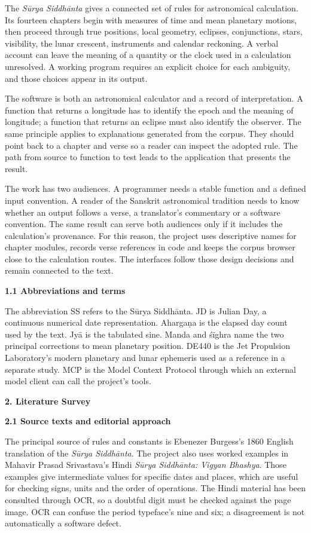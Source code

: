 \documentclass[
]{article}
\begin{document}
The \emph{Sūrya Siddhānta} gives a connected set of rules for
astronomical calculation. Its fourteen chapters begin with measures of
time and mean planetary motions, then proceed through true positions,
local geometry, eclipses, conjunctions, stars, visibility, the lunar
crescent, instruments and calendar reckoning. A verbal account can leave
the meaning of a quantity or the clock used in a calculation unresolved.
A working program requires an explicit choice for each ambiguity, and
those choices appear in its output.

The software is both an astronomical calculator and a record of
interpretation. A function that returns a longitude has to identify the
epoch and the meaning of longitude; a function that returns an eclipse
must also identify the observer. The same principle applies to
explanations generated from the corpus. They should point back to a
chapter and verse so a reader can inspect the adopted rule. The path
from source to function to test leads to the application that presents
the result.

The work has two audiences. A programmer needs a stable function and a
defined input convention. A reader of the Sanskrit astronomical
tradition needs to know whether an output follows a verse, a
translator's commentary or a software convention. The same result can
serve both audiences only if it includes the calculation's provenance.
For this reason, the project uses descriptive names for chapter modules,
records verse references in code and keeps the corpus browser close to
the calculation routes. The interfaces follow those design decisions and
remain connected to the text.

\textbf{1.1 Abbreviations and terms}

The abbreviation SS refers to the Sūrya Siddhānta. JD is Julian Day, a
continuous numerical date representation. Ahargaṇa is the elapsed day
count used by the text. Jyā is the tabulated sine. Manda and śīghra name
the two principal corrections to mean planetary position. DE440 is the
Jet Propulsion Laboratory's modern planetary and lunar ephemeris used as
a reference in a separate study. MCP is the Model Context Protocol
through which an external model client can call the project's tools.

\textbf{2. Literature Survey}

\textbf{2.1 Source texts and editorial approach}

The principal source of rules and constants is Ebenezer Burgess's 1860
English translation of the \emph{Sūrya Siddhānta}. The project also uses
worked examples in Mahavir Prasad Srivastava's Hindi \emph{Sūrya
Siddhānta: Vigyan Bhashya}. Those examples give intermediate values for
specific dates and places, which are useful for checking signs, units
and the order of operations. The Hindi material has been consulted
through OCR, so a doubtful digit must be checked against the page image.
OCR can confuse the period typeface's nine and six; a disagreement is
not automatically a software defect.
\end{document}
